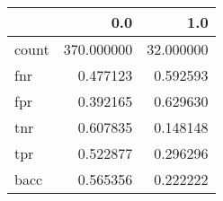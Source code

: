 \begin{tabular}{lrr}
\toprule
{} &         0.0 &        1.0 \\
\midrule
count &  370.000000 &  32.000000 \\
fnr   &    0.477123 &   0.592593 \\
fpr   &    0.392165 &   0.629630 \\
tnr   &    0.607835 &   0.148148 \\
tpr   &    0.522877 &   0.296296 \\
bacc  &    0.565356 &   0.222222 \\
\bottomrule
\end{tabular}
